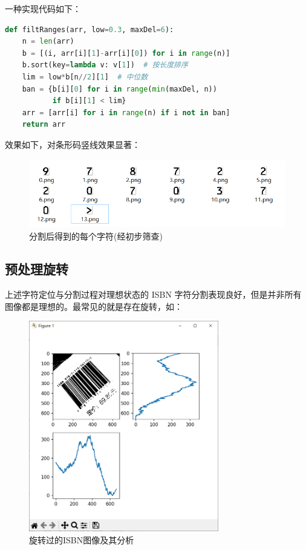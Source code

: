\documentclass{ctexart}
\begin{document}
一种实现代码如下：
\begin{lstlisting}[language=python]
def filtRanges(arr, low=0.3, maxDel=6):
    n = len(arr)
    b = [(i, arr[i][1]-arr[i][0]) for i in range(n)]
    b.sort(key=lambda v: v[1])  # 按长度排序
    lim = low*b[n//2][1]  # 中位数
    ban = {b[i][0] for i in range(min(maxDel, n))
           if b[i][1] < lim}
    arr = [arr[i] for i in range(n) if i not in ban]
    return arr
\end{lstlisting}

效果如下，对条形码竖线效果显著：
\begin{figure}[H]
    \centering
    \includegraphics[height=85pt]{sample_splitNum_flit}
    \caption{分割后得到的每个字符(经初步筛查)}
\end{figure}

\subsection{预处理旋转}
上述字符定位与分割过程对理想状态的 ISBN 字符分割表现良好，但是并非所有图像都是理想的。最常见的就是存在旋转，如：

\begin{figure}[H]
    \centering
    \includegraphics[height=260pt]{isbn_rotated}
    \caption{旋转过的ISBN图像及其分析}
\end{figure}
\end{document}

